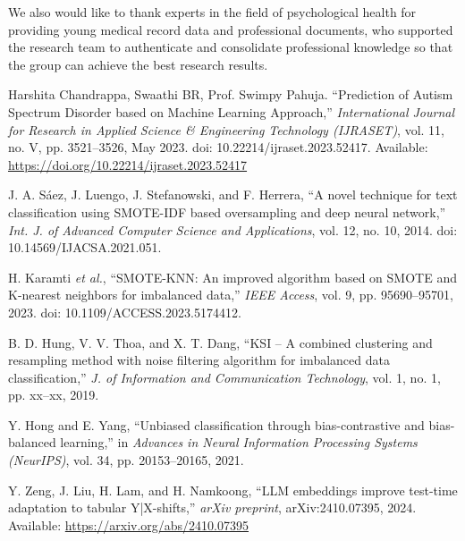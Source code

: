 \documentclass[conference]{IEEEtran}
\begin{document}
We also would like to thank experts in the field of psychological health for providing young medical record data and professional documents, who supported the research team to authenticate and consolidate professional knowledge so that the group can achieve the best research results.

\begin{thebibliography}{99}

 Harshita Chandrappa, Swaathi BR, Prof. Swimpy Pahuja. ``Prediction of Autism Spectrum Disorder based on Machine Learning Approach,'' \textit{International Journal for Research in Applied Science \& Engineering Technology (IJRASET)}, vol. 11, no. V, pp. 3521–3526, May 2023. doi: 10.22214/ijraset.2023.52417.
Available: \url{https://doi.org/10.22214/ijraset.2023.52417}

 J. A. Sáez, J. Luengo, J. Stefanowski, and F. Herrera, ``A novel technique for text classification using SMOTE-IDF based oversampling and deep neural network,'' \textit{Int. J. of Advanced Computer Science and Applications}, vol. 12, no. 10, 2014. doi: 10.14569/IJACSA.2021.051.

 H. Karamti \textit{et al.}, ``SMOTE-KNN: An improved algorithm based on SMOTE and K-nearest neighbors for imbalanced data,'' \textit{IEEE Access}, vol. 9, pp. 95690--95701, 2023. doi: 10.1109/ACCESS.2023.5174412.

 B. D. Hung, V. V. Thoa, and X. T. Dang, ``KSI – A combined clustering and resampling method with noise filtering algorithm for imbalanced data classification,'' \textit{J. of Information and Communication Technology}, vol. 1, no. 1, pp. xx--xx, 2019.

 Y. Hong and E. Yang, ``Unbiased classification through bias-contrastive and bias-balanced learning,'' in \textit{Advances in Neural Information Processing Systems (NeurIPS)}, vol. 34, pp. 20153--20165, 2021.


 Y. Zeng, J. Liu, H. Lam, and H. Namkoong, ``LLM embeddings improve test-time adaptation to tabular Y|X-shifts,'' \textit{arXiv preprint}, arXiv:2410.07395, 2024. Available: \url{https://arxiv.org/abs/2410.07395}


\end{thebibliography}
\end{document}
